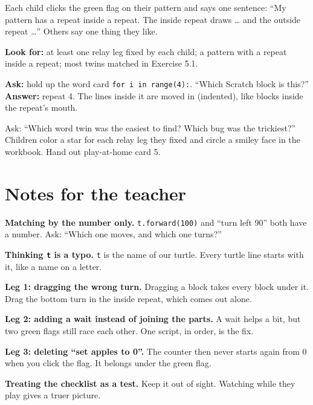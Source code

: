 \begin{teacherscript}
Each child clicks the green flag on their pattern and says one sentence: \enquote{My pattern has a repeat inside a repeat. The inside repeat draws \ldots{} and the outside repeat \ldots} Others say one thing they like.
\end{teacherscript}

\begin{formativecheck}
\textbf{Look for:} at least one relay leg fixed by each child; a pattern with a repeat inside a repeat; most twins matched in Exercise 5.1.

\textbf{Ask:} hold up the word card \texttt{for i in range(4):}. \enquote{Which Scratch block is this?}
\textbf{Answer:} repeat 4. The lines inside it are moved in (indented), like blocks inside the repeat's mouth.
\end{formativecheck}

\begin{reflection}
Ask: \enquote{Which word twin was the easiest to find? Which bug was the trickiest?} Children color a star for each relay leg they fixed and circle a smiley face in the workbook. Hand out play-at-home card 5.
\end{reflection}

\section{Notes for the teacher}
\begin{commonmistakes}
  \item \textbf{Matching by the number only.} \texttt{t.forward(100)} and \enquote{turn left 90} both have a number. Ask: \enquote{Which one moves, and which one turns?}
  \item \textbf{Thinking \texttt{t} is a typo.} \texttt{t} is the name of our turtle. Every turtle line starts with it, like a name on a letter.
  \item \textbf{Leg 1: dragging the wrong turn.} Dragging a block takes every block under it. Drag the bottom turn in the inside repeat, which comes out alone.
  \item \textbf{Leg 2: adding a wait instead of joining the parts.} A wait helps a bit, but two green flags still race each other. One script, in order, is the fix.
  \item \textbf{Leg 3: deleting \enquote{set apples to 0}.} The counter then never starts again from 0 when you click the flag. It belongs under the green flag.
  \item \textbf{Treating the checklist as a test.} Keep it out of sight. Watching while they play gives a truer picture.
\end{commonmistakes}

